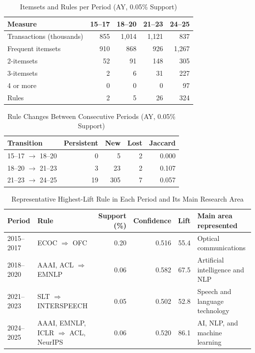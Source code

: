 \documentclass[conference]{IEEEtran}
\begin{document}
\begin{table}[t]
\caption{Itemsets and Rules per Period (AY, 0.05\% Support)}
\label{tab:temporal}
\centering
\footnotesize
\begin{tabular}{lrrrr}
\toprule
Measure & 15--17 & 18--20 & 21--23 & 24--25 \\
\midrule
Transactions (thousands) & 855 & 1,014 & 1,121 & 837 \\
Frequent itemsets & 910 & 868 & 926 & 1,267 \\
2-itemsets & 52 & 91 & 148 & 305 \\
3-itemsets & 2 & 6 & 31 & 227 \\
4 or more & 0 & 0 & 0 & 97 \\
Rules & 2 & 5 & 26 & 324 \\
\bottomrule
\end{tabular}
\end{table}

\begin{table}[t]
\caption{Rule Changes Between Consecutive Periods (AY, 0.05\% Support)}
\label{tab:ruletrans}
\centering
\footnotesize
\begin{tabular}{lrrrr}
\toprule
Transition & Persistent & New & Lost & Jaccard \\
\midrule
15--17 $\rightarrow$ 18--20 & 0 & 5 & 2 & 0.000 \\
18--20 $\rightarrow$ 21--23 & 3 & 23 & 2 & 0.107 \\
21--23 $\rightarrow$ 24--25 & 19 & 305 & 7 & 0.057 \\
\bottomrule
\end{tabular}
\end{table}

\begin{table}[t]
\caption{Representative Highest-Lift Rule in Each Period and Its Main Research Area}
\label{tab:periodrules}
\centering
\scriptsize
\setlength{\tabcolsep}{4pt}
\begin{tabular}{p{1.35cm}p{6.1cm}rrrp{4.3cm}}
\toprule
Period & Rule & Support (\%) & Confidence & Lift & Main area represented \\
\midrule
2015--2017 & ECOC $\Rightarrow$ OFC & 0.20 & 0.516 & 55.4 & Optical communications \\
2018--2020 & AAAI, ACL $\Rightarrow$ EMNLP & 0.06 & 0.582 & 67.5 & Artificial intelligence and NLP \\
2021--2023 & SLT $\Rightarrow$ INTERSPEECH & 0.05 & 0.502 & 52.8 & Speech and language technology \\
2024--2025 & AAAI, EMNLP, ICLR $\Rightarrow$ ACL, NeurIPS & 0.06 & 0.520 & 86.1 & AI, NLP, and machine learning \\
\bottomrule
\end{tabular}
\end{table}
\end{document}
